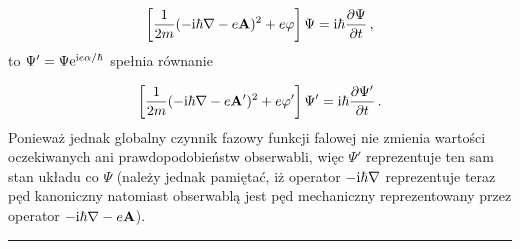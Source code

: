 \documentclass{myclass}
\begin{document}
\begin{equation*}
    \left[\frac{1}{2m}(-\mathrm{i}\hbar\nabla-e\mathbf{A})^2+e\varphi\right]\Psi=\mathrm{i}\hbar\pdv{\Psi}{t}\,,
\end{equation*}
to \(\Psi'=\Psi\mathrm{e}^{\mathrm{i} e\alpha/\hbar}\) spełnia równanie

\begin{equation*}
    \left[\frac{1}{2m}(-\mathrm{i}\hbar\nabla-e\mathbf{A}')^2+e\varphi'\right]\Psi'=\mathrm{i}\hbar\pdv{\Psi'}{t}\,.
\end{equation*}
Ponieważ jednak globalny czynnik fazowy funkcji falowej nie zmienia wartości oczekiwanych ani
prawdopodobieństw obserwabli, więc \(\Psi'\) reprezentuje ten sam stan układu co \(\Psi\) (należy
jednak pamiętać, iż operator \(-\mathrm{i}\hbar\nabla\) reprezentuje teraz pęd kanoniczny natomiast
obserwablą jest pęd mechaniczny reprezentowany przez operator \(-\mathrm{i}\hbar\nabla-e\mathbf{A}\)).\\
\noindent\rule{\columnwidth}{0.5pt}\\
\end{document}

